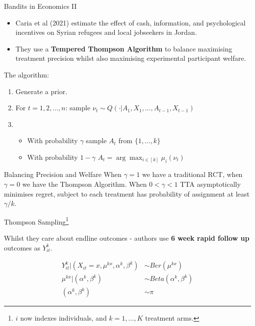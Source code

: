 \documentclass[aspectratio=169,xcolor=dvipsnames]{beamer}
\begin{document}
\begin{frame}{Bandits in Economics II}


    \begin{itemize}
        \item Caria et al (2021) estimate the effect of cash, information, and psychological 
    incentives on Syrian refugees and local jobseekers in Jordan. 
        \item They use a \textbf{Tempered Thompson Algorithm} to balance maximising treatment 
    precision whilst also maximising experimental participant welfare.
    \end{itemize}

    The algorithm:

    \begin{enumerate}
        \item Generate a prior.
        \item For $t = 1,2,...,n$: sample $\nu_t \sim Q(\cdot | A_1, X_1, ..., A_{t-1}, X_{t-1})$
        \item \begin{itemize}
            \item With probability $\gamma$  sample $A_t$ from $\{1, ..., k\}$
            \item With probability $1 - \gamma$ $A_t = \arg\max_{i \in [k]} \mu_i(\nu_t)$
        \end{itemize} 
    \end{enumerate}

    \begin{exampleblock}{Balancing Precision and Welfare}
        When $\gamma = 1$ we have a traditional RCT, when $\gamma = 0$ we have the 
        Thompson Algorithm. 
        When $0 < \gamma < 1$ TTA asymptotically minimises regret, subject to  
        each treatment has probability of assignment at least $\gamma/k$.
    \end{exampleblock}
\end{frame}

\begin{frame}{Thompson Sampling\footnote{$i$ now indexes individuals, and $k = 1, ..., K$ treatment arms.}}

    Whilst they care about endline outcomes - authors use \textbf{6 week rapid follow up} outcomes as
    $Y_{it}^k$.

    \begin{align*}
       Y_{it}^k | (X_{it} = x, \mu^{kx}, \alpha^k, \beta^k) &\sim Ber(\mu^{kx}) \\
       \mu^{kx} | (\alpha^k, \beta^k) &\sim Beta(\alpha^k, \beta^k) \\
       (\alpha^k, \beta^k) &\sim \pi
    \end{align*}

\end{frame}
\end{document}
